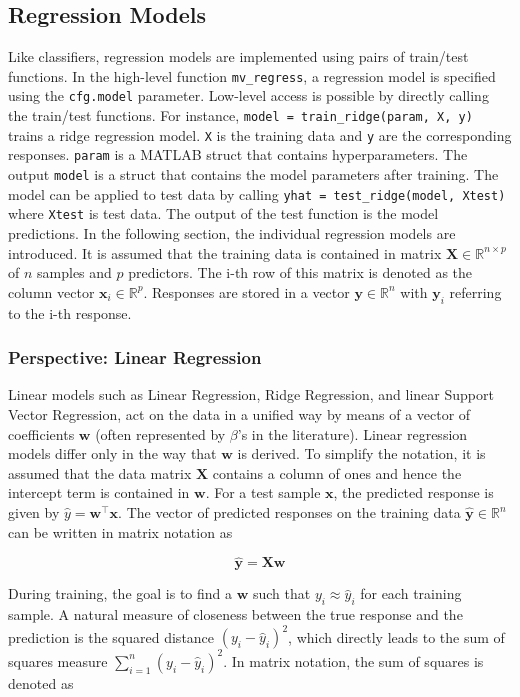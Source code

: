 \documentclass[utf8]{frontiersSCNS} %
\newcommand{\w}{\mathbf{w}}
\newcommand{\x}{\mathbf{x}}
\newcommand{\y}{\mathbf{y}}
\newcommand{\yhat}{\widehat{\mathbf{y}}}
\newcommand{\R}{\mathbb{R}}
\newcommand{\X}{\mathbf{X}}
\newcommand{\ttt}[1]{\texttt{#1}}
\begin{document}
\subsection{Regression Models}\label{sec:regression}

Like classifiers, regression models are implemented using pairs of train/test functions. In the high-level function \ttt{mv\_regress}, a regression model is specified using the \ttt{cfg.model} parameter. Low-level access is possible by directly calling the train/test functions. For instance, \ttt{model = train\_ridge(param, X, y)} trains a ridge regression model. \ttt{X} is the training data and \ttt{y} are the corresponding responses. \ttt{param} is a MATLAB struct that contains hyperparameters. The output \ttt{model} is a struct that contains the model parameters after training. The model can be applied to test data by calling \ttt{yhat = test\_ridge(model, Xtest)} where \ttt{Xtest} is test data. The output of the test function is the model predictions. In the following section, the individual regression models are introduced. It is assumed that the training data is contained in matrix $\X\in\R^{n \times p}$ of $n$ samples and $p$ predictors. The i-th row of this matrix is denoted as the column vector $\x_i\in\R^p$. Responses are stored in a vector $\y\in\R^n$ with $\y_i$ referring to the i-th response.

\subsubsection{Perspective: Linear Regression}

Linear models such as Linear Regression, Ridge Regression, and linear Support Vector Regression, act on the data in a unified way by means of a vector of coefficients $\w$ (often represented by $\beta$'s in the literature). Linear regression models differ only in the way that $\w$ is derived. To simplify the notation, it is assumed that the data matrix $\X$ contains a column of ones and hence the intercept term is contained in $\w$. For a test sample $\x$, the predicted response is given by $\widehat{y} = \w^\top\x$. The vector of predicted responses on the training data $\yhat\in\R^n$ can be written in matrix notation as 

\begin{equation}
\label{eq:linreg_prediction}
\yhat = \X\w
\end{equation}

During training, the goal is to find a $\w$ such that $y_i \approx\widehat{y}_i$ for each training sample. A natural measure of closeness between the true response and the prediction is the squared distance $(y_i - \widehat{y}_i)^2$, which directly leads to the sum of squares measure $\sum_{i=1}^n (y_i - \widehat{y}_i)^2$. In matrix notation, the sum of squares is denoted as
\end{document}
